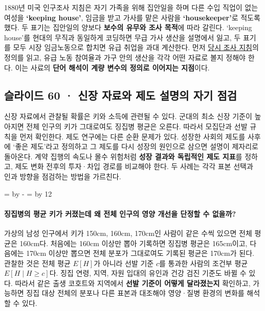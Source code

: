 \documentclass[10pt,a4paper]{article}
\newcommand{\ReserveQuestionSpace}{%
  \par\begingroup
  \dimen0=\pagegoal \advance\dimen0 by -\pagetotal
  \dimen2=\baselineskip \multiply\dimen2 by 12
  \ifdim\dimen0<\dimen2 \newpage\fi
  \endgroup}
\begin{document}
1880년 미국 인구조사 지침은 자기 가족을 위해 집안일을 하며 다른 수입 직업이 없는 여성을 \textbf{‘keeping house’}, 임금을 받고 가사를 맡은 사람을 \textbf{‘housekeeper’}로 적도록 했다. 두 표기는 집안일의 양보다 \textbf{보수의 유무와 조사 목적}에 따라 갈린다. ‘keeping house’를 현대의 무직과 동일하게 코딩하면 무급 가사 생산을 설명에서 잃고, 두 표기를 모두 시장 임금노동으로 합치면 유급 취업을 과대 계산한다. 먼저 \href{https://www.census.gov/programs-surveys/decennial-census/technical-documentation/questionnaires/1880/1880-instructions.html}{당시 조사 지침}의 정의를 읽고, 유급 노동 참여율과 가구 안의 생산을 각각 어떤 자료로 볼지 정해야 한다. 이는 사료의 \textbf{단어 해석이 계량 변수의 정의로 이어지는 지점}이다.\par

\subsection{슬라이드 60 · 신장 자료와 제도 설명의 자기 점검}
신장 자료에서 관찰될 확률은 키와 소득에 관련될 수 있다. 군대의 최소 신장 기준이 높아지면 전체 인구의 키가 그대로여도 징집병 평균은 오른다. 따라서 모집단과 선발 규칙을 먼저 확인한다. 제도 연구에는 다른 순환 문제가 있다. 성장한 사회의 제도를 사후에 ‘좋은 제도’라고 정의하고 그 제도를 다시 성장의 원인으로 삼으면 설명이 제자리로 돌아온다. 계약 집행의 속도나 몰수 위험처럼 \textbf{성장 결과와 독립적인 제도 지표}를 정하고, 제도 변화 전후의 투자·차입 경로를 비교해야 한다. 두 사례는 각각 표본 선택과 인과 방향을 점검하는 방법을 가르친다.\par

\ReserveQuestionSpace
\paragraph{징집병의 평균 키가 커졌는데 왜 전체 인구의 영양 개선을 단정할 수 없을까?}

가상의 남성 인구에서 키가 150cm, 160cm, 170cm인 사람이 같은 수씩 있으면 전체 평균은 160cm다. 처음에는 160cm 이상만 뽑아 기록하면 징집병 평균은 165cm이고, 다음에는 170cm 이상만 뽑으면 전체 분포가 그대로여도 기록된 평균은 170cm가 된다. 관찰한 것은 전체 평균 $E[H]$가 아니라 선발 기준 $c$를 통과한 사람의 조건부 평균 $E[H\mid H\geq c]$다. 징집 연령, 지역, 자원 입대의 유인과 건강 검진 기준도 바뀔 수 있다. 따라서 같은 출생 코호트와 지역에서 \textbf{선발 기준이 어떻게 달라졌는지} 확인하고, 가능하면 징집 대상 전체의 분포나 다른 표본과 대조해야 영양·질병 환경의 변화를 해석할 수 있다.\par
\end{document}
